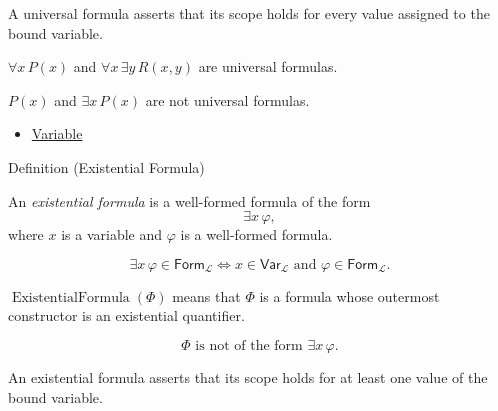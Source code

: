 \begin{remark*}[Interpretation]
A universal formula asserts that its scope holds for every value assigned to
the bound variable.
\end{remark*}

\begin{remark*}[Examples]
\(\forall x\,P(x)\) and \(\forall x\,\exists y\,R(x,y)\) are universal
formulas.
\end{remark*}

\begin{remark*}
\(P(x)\) and \(\exists x\,P(x)\) are not universal formulas.
\end{remark*}

\begin{dependencies}
\begin{itemize}
  \item \hyperref[def:variable]{Variable}
\end{itemize}
\end{dependencies}

\begin{definitionbox}{Definition (Existential Formula)}
\begin{definition}
\label{def:existential-q}
An \emph{existential formula} is a well-formed formula of the form
\[
\exists x\,\varphi,
\]
where \(x\) is a variable and \(\varphi\) is a well-formed formula.
\end{definition}
\end{definitionbox}

\begin{remark*}
\[
\exists x\,\varphi\in\mathsf{Form}_{\mathcal L}
\Longleftrightarrow
x\in\mathsf{Var}_{\mathcal L}
\text{ and }
\varphi\in\mathsf{Form}_{\mathcal L}.
\]
\end{remark*}

\begin{remark*}
\(\operatorname{ExistentialFormula}(\Phi)\) means that \(\Phi\) is a formula
whose outermost constructor is an existential quantifier.
\end{remark*}

\begin{remark*}
\[
\Phi \text{ is not of the form } \exists x\,\varphi.
\]
\end{remark*}

\begin{remark*}[Interpretation]
An existential formula asserts that its scope holds for at least one value of
the bound variable.
\end{remark*}

